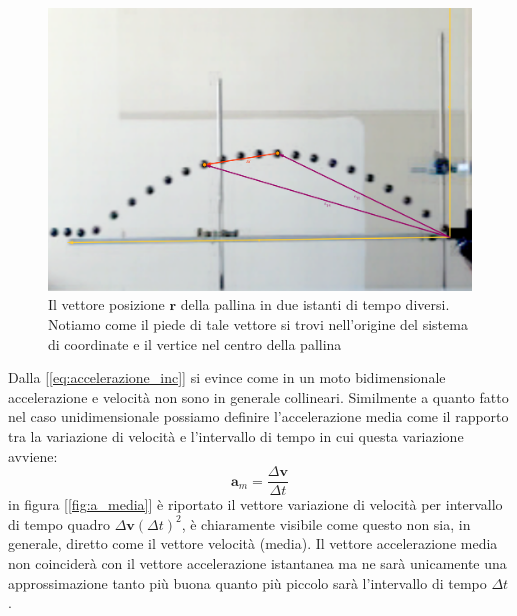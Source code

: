 \documentclass[a4paper,10pt,oneside]{article}
\begin{document}
\begin{figure}[H]
\includegraphics[width=\textwidth]{./immagini/vettori_posizione.png}
\caption{Il vettore posizione $\mathbf{r}$ della pallina in due istanti di tempo diversi. Notiamo come il piede di tale vettore si trovi nell'origine del sistema di coordinate e il vertice nel centro della pallina}\label{fig:posizione}
\end{figure}
Dalla [\ref{eq:accelerazione_inc}] si evince come in un moto bidimensionale accelerazione e velocità non sono in generale collineari.
Similmente a quanto fatto nel caso unidimensionale possiamo definire l'accelerazione media come il rapporto tra la variazione di velocità e l'intervallo di tempo in cui questa variazione avviene:
\begin{equation}
 \mathbf{a}_m=\frac{\Delta \mathbf{v}}{\Delta t}
\end{equation}
in figura [\ref{fig:a_media}] è riportato il vettore variazione di velocità per intervallo di tempo quadro $\Delta \mathbf{v}(\Delta t)^2$, è chiaramente visibile come questo non sia, in generale, diretto come il vettore velocità (media).
Il vettore accelerazione media non coinciderà con il vettore accelerazione istantanea ma ne sarà unicamente una approssimazione tanto più buona quanto più piccolo sarà l'intervallo di tempo $\Delta t $.
\end{document}
